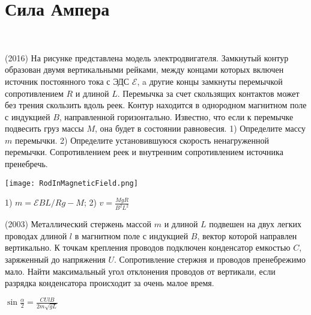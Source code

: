 \section{Сила Ампера}

\begin{ex}
\hspace{0pt} \\
\begin{minipage}{.65\textwidth}
(2016) На рисунке представлена модель электродвигателя. Замкнутый контур образован двумя вертикальными рейками, между концами которых включен источник постоянного тока с ЭДС $\mathcal{E}$, a другие концы замкнуты перемычкой сопротивлением $R$ и длиной $L$. Перемычка за счет скользящих контактов может без трения скользить вдоль реек. Контур находится в однородном магнитном поле с индукцией $B$, направленной горизонтально. Известно, что если к перемычке подвесить груз массы $M$, она будет в состоянии равновесия. 1) Определите массу $m$ перемычки. 2) Определите установившуюся скорость ненагруженной перемычки. Сопротивлением реек и внутренним сопротивлением источника пренебречь.
\end{minipage}
\begin{minipage}{.35\textwidth}
\centering
\texttt{[image: RodInMagneticField.png]}
\end{minipage}
\begin{ans}
1) $m=\mathcal{E}BL/Rg - M$; 2) $v = \frac{MgR}{B^2L^2}$
\end{ans}
\end{ex}

\begin{ex}
(2003) Металлический стержень массой $m$ и длиной $L$ подвешен на двух легких проводах длиной $l$ в магнитном поле с индукцией $B$, 
вектор которой направлен вертикально. К точкам крепления проводов подключен конденсатор емкостью $C$, заряженный до напряжения $U$. 
Сопротивление стержня и проводов пренебрежимо мало. Найти максимальный угол отклонения проводов от вертикали, если разрядка конденсатора происходит за очень малое время.
\begin{ans}
$\sin \frac {\alpha}{2} = \frac{CUlB}{2m \sqrt{gL}}$
\end{ans}
\end{ex}

